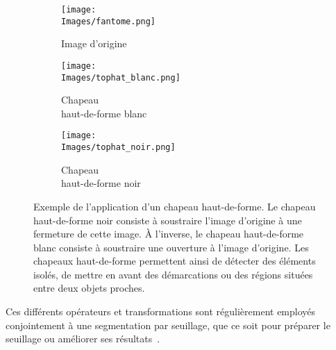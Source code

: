 \documentclass[\main/main.tex]{subfiles}
\providecommand{\Images}{\main/Figures/intro_seg}
\begin{document}
\begin{figure}[h!]
    \centering
    \begin{subfigure}[b]{0.30\textwidth}
       \caption{
       Image d'origine
            }
       \centering \texttt{[image: \\Images/fantome.png]}
    \end{subfigure}
    \begin{subfigure}[b]{0.30\textwidth}
       \caption{
       \label{fig:tophat:blanc}
            Chapeau \\ haut-de-forme blanc
            }
       \centering \texttt{[image: \\Images/tophat\_blanc.png]}
    \end{subfigure}
    \begin{subfigure}[b]{0.30\textwidth}
       \caption{
           \label{fig:tophat:noir}
            Chapeau \\ haut-de-forme noir
            }
       \centering \texttt{[image: \\Images/tophat\_noir.png]}
    \end{subfigure}
    \caption{
        Exemple de l'application d'un chapeau haut-de-forme.
        \newline
        Le chapeau haut\hyp{}de\hyp{}forme noir consiste à soustraire l'image d'origine à une fermeture de cette image. À l'inverse, le chapeau haut\hyp{}de\hyp{}forme blanc consiste à soustraire une ouverture à l'image d'origine.
        \newline
        Les chapeaux haut-de-forme permettent ainsi de détecter des éléments isolés,
        de mettre en avant des démarcations
        ou des régions situées entre deux objets proches.
    }
\end{figure}
%
Ces différents opérateurs et transformations sont régulièrement employés conjointement à une segmentation par seuillage,
que ce soit pour préparer le seuillage ou améliorer ses résultats~\cite{ilhan_2017,bahadarkhan_2016}.
\end{document}
